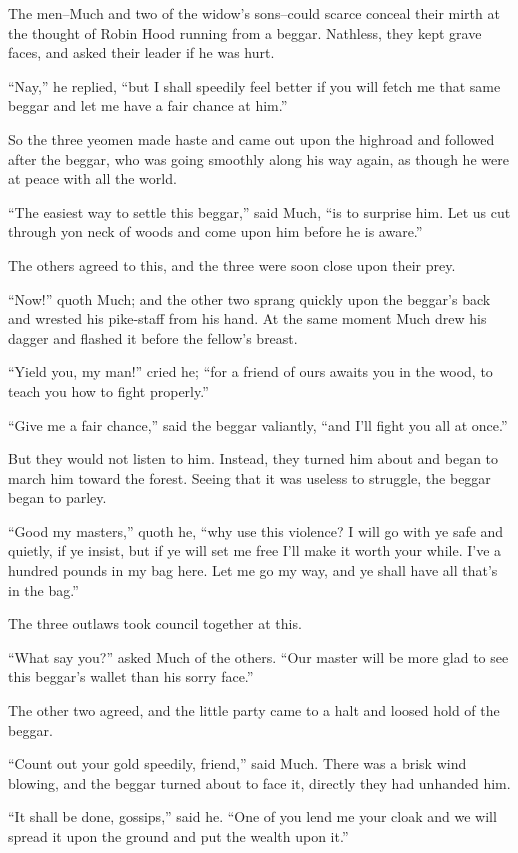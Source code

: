 The men--Much and two of the widow's sons--could scarce conceal their
mirth at the thought of Robin Hood running from a beggar. Nathless, they
kept grave faces, and asked their leader if he was hurt.

``Nay,'' he replied, ``but I shall speedily feel better if you will
fetch me that same beggar and let me have a fair chance at him.''

So the three yeomen made haste and came out upon the highroad and
followed after the beggar, who was going smoothly along his way again,
as though he were at peace with all the world.

``The easiest way to settle this beggar,'' said Much, ``is to surprise
him. Let us cut through yon neck of woods and come upon him before he is
aware.''

The others agreed to this, and the three were soon close upon their
prey.

``Now!'' quoth Much; and the other two sprang quickly upon the beggar's
back and wrested his pike-staff from his hand. At the same moment Much
drew his dagger and flashed it before the fellow's breast.

``Yield you, my man!'' cried he; ``for a friend of ours awaits you in
the wood, to teach you how to fight properly.''

``Give me a fair chance,'' said the beggar valiantly, ``and I'll fight
you all at once.''

But they would not listen to him. Instead, they turned him about and
began to march him toward the forest. Seeing that it was useless to
struggle, the beggar began to parley.

``Good my masters,'' quoth he, ``why use this violence? I will go with
ye safe and quietly, if ye insist, but if ye will set me free I'll make
it worth your while. I've a hundred pounds in my bag here. Let me go my
way, and ye shall have all that's in the bag.''

The three outlaws took council together at this.

``What say you?'' asked Much of the others. ``Our master will be more
glad to see this beggar's wallet than his sorry face.''

The other two agreed, and the little party came to a halt and loosed
hold of the beggar.

``Count out your gold speedily, friend,'' said Much. There was a brisk
wind blowing, and the beggar turned about to face it, directly they had
unhanded him.

``It shall be done, gossips,'' said he. ``One of you lend me your cloak
and we will spread it upon the ground and put the wealth upon it.''

